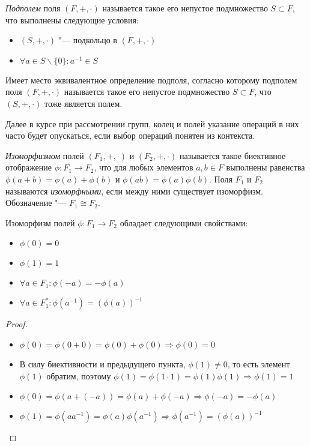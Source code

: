 \begin{definition}
	\textit{Подполем} поля $(F, +, \cdot)$ называется такое его непустое подмножество $S \subset F$, что выполнены следующие условия:
	\begin{itemize}
		\item $(S, +, \cdot)$ "--- подкольцо в $(F, +, \cdot)$
		\item $\forall a \in S\backslash\{0\}: a^{-1} \in S$
	\end{itemize}
\end{definition}

\begin{note}
	Имеет место эквивалентное определение подполя, согласно которому подполем поля $(F, +, \cdot)$ называется такое его непустое подмножество $S \subset F$, что $(S, +, \cdot)$ тоже является полем.
\end{note}

\begin{note}
	Далее в курсе при рассмотрении групп, колец и полей указание операций в них часто будет опускаться, если выбор операций понятен из контекста.
\end{note}

\begin{definition}
	\textit{Изоморфизмом} полей $(F_1, +, \cdot)$ и $(F_2, +, \cdot)$ называется такое биективное отображение $\phi : F_1 \rightarrow F_2$, что для любых элементов $a, b \in F$ выполнены равенства $\phi(a + b) = \phi(a) + \phi(b)$ и $\phi(ab) = \phi(a)\phi(b)$. Поля $F_1$ и $F_2$ называются \textit{изоморфными}, если между ними существует изоморфизм. Обозначение "--- $F_1 \cong F_2$.
\end{definition}

\begin{proposition}
	Изоморфизм полей $\phi: F_1 \to F_2$ обладает следующими свойствами:
	\begin{itemize}
		\item $\phi(0) = 0$
		\item $\phi(1) = 1$
		\item $\forall a \in F_1: \phi(-a) = -\phi(a)$
		\item $\forall a \in F_1^*: \phi(a^{-1}) = (\phi(a))^{-1}$
	\end{itemize}
\end{proposition}

\begin{proof}~
	\begin{itemize}
		\item $\phi(0) = \phi(0 + 0) = \phi(0) + \phi(0) \Rightarrow \phi(0) = 0$
		\item В силу биективности и предыдущего пункта, $\phi(1) \ne 0$, то есть элемент $\phi(1)$ обратим, поэтому $\phi(1) = \phi(1\cdot1) = \phi(1)\phi(1) \Rightarrow \phi(1) = 1$
		\item $\phi(0) = \phi(a + (-a)) = \phi(a) + \phi(-a) \Rightarrow \phi(-a) = -\phi(a)$
		\item $\phi(1) = \phi(aa^{-1}) = \phi(a)\phi(a^{-1}) \Rightarrow \phi(a^{-1}) = (\phi(a))^{-1}$\qedhere
	\end{itemize}
\end{proof}

